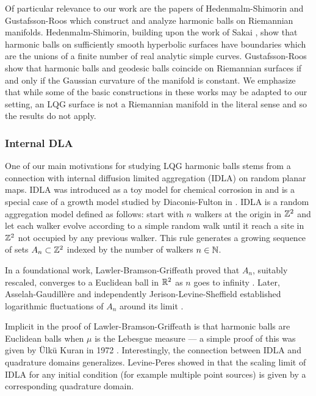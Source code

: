 \documentclass[12pt]{amsart}
\numberwithin{equation}{section}
\begin{document}
	Of particular relevance to our work are the papers of Hedenmalm-Shimorin \cite{hedenmalm2002hele} and Gustafsson-Roos \cite{gustafsson2018partial} which construct and analyze harmonic balls on Riemannian manifolds. Hedenmalm-Shimorin, building upon the work of Sakai \cite{sakai1991regularity}, show that harmonic balls on sufficiently smooth hyperbolic surfaces have boundaries which are the unions of a finite number of real analytic simple curves.
	Gustafsson-Roos show that harmonic balls and geodesic balls coincide on Riemannian surfaces 
	if and only if the Gaussian curvature of the manifold is constant. We emphasize that while some of the 
	basic constructions in these works may be adapted to our setting, an LQG surface is not a Riemannian
	manifold in the literal sense and so the results do not apply. 
	
	
	
	\subsubsection{Internal DLA}
	One of our main motivations for studying LQG harmonic balls stems from a connection with internal diffusion limited aggregation (IDLA) on random planar maps. 
	IDLA was introduced as a toy model for chemical corrosion in \cite{meakin1986formation} and is a special case of a growth model studied by Diaconis-Fulton in \cite{diaconis1991growth}. IDLA is a random aggregation model defined as follows: start with $n$ walkers at the origin in $\mathbb{Z}^2$ and let each walker evolve according to a simple random walk until it reach a site in $\mathbb{Z}^2$ not occupied by any previous walker. This rule
	generates a growing sequence of sets $A_n \subset \mathbb{Z}^2$ indexed by the number of walkers $n \in \mathbb{N}$. 
	
	In a foundational work, Lawler-Bramson-Griffeath proved that $A_n$, suitably rescaled, converges to a Euclidean ball in $\mathbb{R}^2$
	as $n$ goes to infinity \cite{lawler1992internal, lawler1995subdiffusive}. Later, Asselah-Gaudillère \cite{asselah2013logarithmic, asselah2013sublogarithmic} and independently Jerison-Levine-Sheffield established logarithmic fluctuations of $A_n$ around its limit \cite{jerison2012logarithmic, jerison2013internal, jerison2014internal}. 
	
	Implicit in the proof of Lawler-Bramson-Griffeath is that harmonic balls are Euclidean balls when $\mu$ is the Lebesgue measure ---
	a simple proof of this was given by {\"U}lk{\"u} Kuran in 1972 \cite{kuran1972mean}. Interestingly, the connection between IDLA and quadrature domains generalizes. Levine-Peres showed in \cite{levine2010scaling} that the scaling limit of IDLA for any initial condition (for example multiple point sources) is given by a corresponding quadrature domain. 
	
\end{document}
